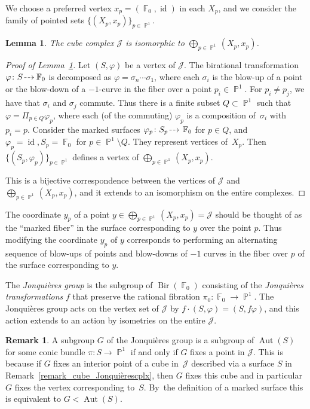 \documentclass[JEP,XML,SOM,Unicode, NoEqCountersInSection,published]{cedram}
\newcommand{\dradpl}{{\hspace*{-2.5mm}\begin{tikzcd}[ampersand replacement=\&,column sep = scriptsize]\mbox{}\ar[r,dashed]\&\mbox{}\end{tikzcd}\hspace*{-2.5mm}}}
\newcommand{\dratst}{{\hspace*{-2.5mm}\begin{tikzcd}[ampersand replacement=\&,column sep = small]\mbox{}\ar[r,dashed]\&\mbox{}\end{tikzcd}\hspace*{-2mm}}}
\let\drascst\dratst
\newcommand{\dra}{\mathchoice{\dradpl}{\dratst}{\drascst}{\drascst}}
\let\dashrightarrow\dra
\newcommand{\p}{\operatorname{\mathbb{P}}}\let\P\p
\newcommand{\F}{\operatorname{\mathbb{F}}}
\newcommand{\id}{\operatorname{id}}
\newcommand{\Aut}{\operatorname{Aut}}
\newcommand{\Bir}{\operatorname{Bir}}
\newcommand{\Jon}{\mathscr{J}}
\theoremstyle{plain}
\newtheorem{lemma}[theorem]{Lemma}
\theoremstyle{definition}
\newtheorem{remark}[theorem]{Remark}
\begin{document}
We choose a preferred vertex
$x_p=(\F_0,\id)$ in each $X_p$, and we consider the family of pointed sets $\{(X_p,x_p)\}_{p\in \p^1}$.

\begin{lemma}\label{lem_product_tress}
The cube complex $\mathscr{J}$ is isomorphic to $\bigoplus_{p\in \p^1} (X_p,x_p)$.
\end{lemma}

\begin{proof}[Proof of Lemma~\ref{lem_product_tress}]
Let $(S,\varphi)$ be
a vertex of $\mathscr{J}$. The birational transformation $\varphi \colon S\dashrightarrow\! \F_0$ is decomposed as $\varphi=\sigma_n\cdots\sigma_1$, where each $\sigma_i$ is the blow-up of a point or the blow-down of a $-1$-curve in the fiber over a point $p_i\in \p^1$. For $p_i\neq p_j$,
we have that $\sigma_i$ and $\sigma_j$ commute. Thus there is a finite subset $Q\subset \p^1$ such that
$\varphi=\Pi_{p\in Q}\varphi_p$, where each (of the commuting) $\varphi_p$ is a composition of~$\sigma_i$ with $p_i=p$.
Consider the marked surfaces $\varphi_p\colon S_p \dashrightarrow\F_0$ for $p\in Q$, and $\varphi_p=\id, S_p=\F_0$ for $p\in \p^1\setminus Q$. They represent vertices of~$X_p$. Then $\{(S_p,\varphi_p)\}_{p\in \p^1}$
defines a vertex of $\bigoplus_{p\in \p^1} (X_p,x_p)$.

This is a bijective correspondence between the vertices of $\mathscr{J}$ and $\bigoplus_{p\in \p^1} (X_p,x_p)$, and it extends to an isomorphism on the entire complexes.
\end{proof}

The coordinate $y_p$ of a point $y\in \bigoplus_{p\in \p^1} (X_p,x_p)=\mathscr{J}$ should be thought of as the ``marked fiber''
in the surface corresponding to $y$ over the point $p$. Thus modifying the coordinate $y_p$ of $y$ corresponds to performing an alternating sequence of blow-ups of points and blow-downs of $-1$ curves in the fiber over $p$ of the surface corresponding to $y$.

\smallskip

The \emph{Jonquières group} is the subgroup of $\Bir(\F_0)$ consisting of the \emph{Jonquières transformations} $f$ that preserve the rational fibration $\pi_0\colon \F_0\to \p^1$. {The Jonquières group acts on the vertex set of $\Jon$ by $f\cdot(S, \varphi)=(S, f\varphi)$,
and this action extends to an action by isometries on the entire $\Jon$.}

\begin{remark}\label{rmk_subjonq_fixpoint}
A subgroup $G$ of the Jonquières group is a subgroup of $\Aut(S)$ for some
conic bundle $\pi \colon S\to \p^1$ if and only if $G$ fixes a point in $\Jon$. This is because if $G$ fixes an interior point of a cube in~$\mathscr{J}$ described via a surface $S$ in Remark~\ref{remark_cube_Jonquièrescplx}, then $G$ {fixes this cube and in particular $G$} fixes the vertex corresponding to~$S$. {By~the definition of a marked surface this is equivalent to} $G< \Aut(S)$.
\end{remark}
\end{document}
